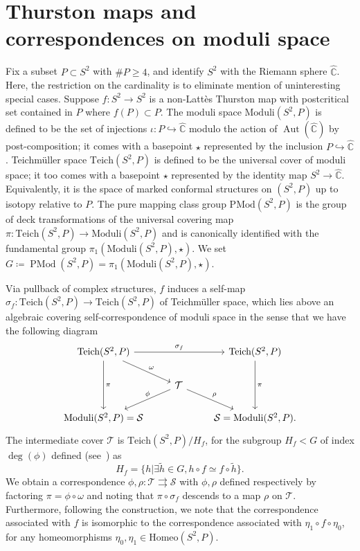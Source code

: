 \documentclass{amsart}
\newcommand\C{{\mathbb{C}}}
\newcommand\Mod{{\operatorname{PMod}}}
\newcommand{\rs}{\widehat{\C}}
\newcommand{\Aut}{{\operatorname{Aut}}}
\newcommand{\Teich}{\text{Teich}}
\newcommand{\Moduli}{\text{Moduli}}
\theoremstyle{definition}
\theoremstyle{remark}
\newcommand{\cT}{\mathcal{T}}
\newcommand{\cS}{\mathcal{S}}
\begin{document}
\section{Thurston maps and correspondences on moduli space}\label{subsec:thmap}
Fix a subset $P \subset S^2$ with $\#P\geq 4$, and identify $S^2$ with the Riemann sphere $\rs$.  Here, the restriction on the cardinality is to eliminate mention of uninteresting special cases.  Suppose $f\colon S^2\to S^2$ is a non-Latt\`es Thurston map with postcritical set contained in $P$ where $f(P) \subset P$. The moduli space $\Moduli(S^2, P)$ is defined to be the set of injections $\iota\colon P \hookrightarrow \rs$ modulo the action of $\Aut(\rs)$ by post-composition; it comes with a basepoint $\star$ represented by the inclusion $P \hookrightarrow \rs$. Teichm\"uller space $\Teich(S^2,P)$ is defined to be the universal cover of moduli space; it too comes with a basepoint $\star$ represented by the identity map $S^2\to\rs$.  Equivalently, it is the space of marked conformal structures on $(S^2, P)$ up to isotopy relative to $P$.  The pure mapping class group $\text{PMod}(S^2, P)$ is the group of deck transformations of the universal covering map $\pi\colon\Teich(S^2,P)\to\Moduli(S^2,P)$ and is canonically identified with the fundamental group $\pi_1(\Moduli(S^2, P),\star)$.  We set $G\coloneqq\Mod(S^2, P)=\pi_1(\Moduli(S^2, P),\star)$. 

Via pullback of complex structures, $f$ induces a self-map $\sigma_f\colon \Teich(S^2, P)\to\Teich(S^2,P)$ of Teichm\"uller space, which lies above an algebraic covering self-correspondence of moduli space in the sense that we have the following diagram 
\begin{equation}\label{eq:modcorr}
  \begin{tikzcd}
  \Teich(S^2,P) \arrow[dd,"\pi"]\arrow[rr,"\sigma_f"] \arrow[dr,"\omega"] & & 
  \Teich(S^2, P) \arrow[dd,"\pi"] \\
  &\mathcal{T}\arrow[dl,"\phi" above] \arrow[dr,"\rho"]\\
  \Moduli(S^2, P)=\cS & & \cS=\Moduli(S^2, P). 
\end{tikzcd}
\end{equation}
The intermediate cover $\cT$ is $\Teich(S^2,P)/H_f$, for the subgroup $H_f<G$ of index $\deg(\phi)$ defined (see~\cite{kmp:kps}) as
\begin{equation}\label{eq:H_f}
  H_f=\{h | \exists \tilde{h}\in G, h\circ f \simeq f\circ \tilde{h}\}.
\end{equation}
We obtain a correspondence $\phi, \rho\colon \cT \rightrightarrows\cS$ with $\phi,\rho$ defined respectively by factoring $\pi=\phi\circ\omega$ and noting that $\pi\circ\sigma_f$ descends to a map $\rho$ on $\cT$. Furthermore, following the construction, we note that the correspondence associated with $f$ is isomorphic to the correspondence associated with $\eta_1\circ f\circ \eta_0$, for any homeomorphisms $\eta_0,\eta_1\in\text{Homeo}(S^2,P)$.
\end{document}
